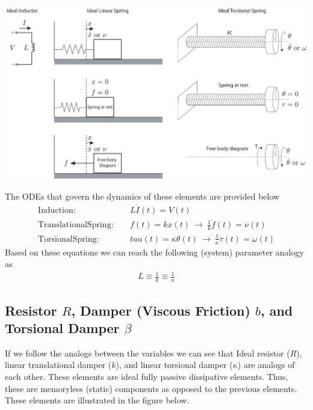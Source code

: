 \documentclass[twoside]{article}
\begin{document}
  \begin{minipage}[h]{1\linewidth}
    \begin{center}
      \includegraphics[width=1\textwidth]{ind}
    \end{center}
  \end{minipage}

The ODEs that govern the dynamics of these elements are provided below
%
\begin{align*}
\mathrm{Induction:}& \quad L \dot{I}(t) = V(t) \\
\mathrm{Translational Spring:}& \quad  f(t) = k x(t) \ \rightarrow \
                                \frac{1}{k} \dot{f}(t) = \nu(t)
\\
\mathrm{Torsional Spring:}& \quad  tau (t) = \kappa \theta(t) \
                            \rightarrow \ \frac{1}{\kappa} \dot{\tau}(t) = \omega(t)
\end{align*}
%
Based on these equations we can reach the following (system) parameter
analogy as
%
\begin{align*}
 L \equiv \frac{1}{k} \equiv \frac{1}{\kappa}
\end{align*}
% 

\subsection{Resistor $R$, Damper (Viscous Friction) $b$, and
Torsional Damper $\beta$}

If we follow the analogs between the variables we can see that Ideal
resistor ($R$), linear translational damper ($k$), and linear
torsional damper ($\kappa$) are analogs of each other. 
These elements are ideal fully passive dissipative elements.
Thus, these are memoryless (static) components as opposed to the
previous elements. These elements are illustrated in the figure below. 
\end{document}
